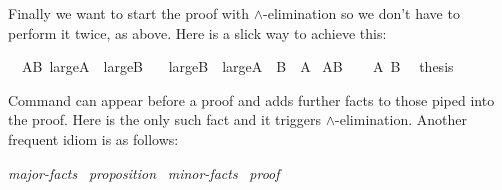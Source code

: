 \begin{isabellebody}
\begin{isamarkuptext}
Finally we want to start the proof with $\land$-elimination so we
don't have to perform it twice, as above. Here is a slick way to
achieve this:%
\end{isamarkuptext}%
\isamarkuptrue%
\isamarkupfalse%
\ \ AB{\isacharcolon}\ {\isachardoublequoteopen}large{\isacharunderscore}A\ {\isasymand}\ large{\isacharunderscore}B{\isachardoublequoteclose}\isanewline
\ \ \ {\isachardoublequoteopen}large{\isacharunderscore}B\ {\isasymand}\ large{\isacharunderscore}A{\isachardoublequoteclose}\ {\isacharparenleft}\ {\isachardoublequoteopen}{\isacharquery}B\ {\isasymand}\ {\isacharquery}A{\isachardoublequoteclose}{\isacharparenright}\isanewline
%
\isadelimproof
%
\endisadelimproof
%
\isatagproof
{}\isamarkupfalse%
\ AB\isanewline
{}\isamarkupfalse%
\isanewline
\ \ \isamarkupfalse%
\ {\isachardoublequoteopen}{\isacharquery}A{\isachardoublequoteclose}\ {\isachardoublequoteopen}{\isacharquery}B{\isachardoublequoteclose}\ \isamarkupfalse%
\ {\isacharquery}thesis\ \isacommand{{\isachardot}{\isachardot}}\isamarkupfalse%
\isanewline
{}\isamarkupfalse%
%
\endisatagproof
{\isafoldproof}%
%
\isadelimproof
%
\endisadelimproof
%
\begin{isamarkuptext}%
\noindent Command  can appear before a proof
and adds further facts to those piped into the proof. Here 
is the only such fact and it triggers $\land$-elimination. Another
frequent idiom is as follows:
\begin{center}
 \emph{major-facts}~
 \emph{proposition}~
 \emph{minor-facts}~
\emph{proof}
\end{center}


\end{isamarkuptext}
\end{isabellebody}
